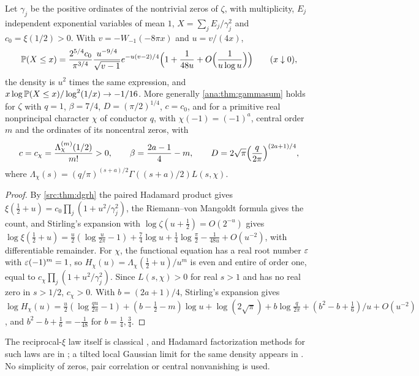 \begin{theorem}\label{ana:thm:smalldev}
Let $\gamma_j$ be the positive ordinates of the nontrivial zeros of $\zeta$, with multiplicity,
$E_j$ independent exponential variables of mean $1$, $X=\sum_jE_j/\gamma_j^2$ and
$c_0=\xi(1/2)>0$. With $v=-W_{-1}(-8\pi x)$ and $u=v/(4x)$,
\[
 \mathbb{P}(X\le x)=\frac{2^{5/4}c_0}{\pi^{3/4}}\frac{u^{-9/4}}{\sqrt{v-1}}e^{-u(v-2)/4}
 \Bigl(1+\frac1{48u}+O\Bigl(\frac1{u\log u}\Bigr)\Bigr)\qquad(x\downarrow0),
\]
the density is $u^2$ times the same expression, and
$x\log\mathbb{P}(X\le x)/\log^2(1/x)\to-1/16$. More generally \cref{ana:thm:gammasum} holds for
$\zeta$ with $q=1$, $\beta=7/4$, $D=(\pi/2)^{1/4}$, $c=c_0$, and for a primitive real
nonprincipal character $\chi$ of conductor $q$, with $\chi(-1)=(-1)^a$, central order $m$ and
the ordinates of its noncentral zeros, with
\[
 c=c_\chi=\frac{\Lambda_\chi^{(m)}(1/2)}{m!}>0,\qquad\beta=\frac{2a-1}4-m,\qquad
 D=2\sqrt\pi\Bigl(\frac q{2\pi}\Bigr)^{(2a+1)/4},
\]
where $\Lambda_\chi(s)=(q/\pi)^{(s+a)/2}\Gamma((s+a)/2)L(s,\chi)$.
\end{theorem}

\begin{proof}
By \cref{src:thm:dgrh} the paired Hadamard product gives
$\xi(\frac12+u)=c_0\prod_j(1+u^2/\gamma_j^2)$, the Riemann--von Mangoldt formula gives the
count, and Stirling's expansion with $\log\zeta(u+\frac12)=O(2^{-u})$ gives
$\log\xi(\frac12+u)=\frac u2(\log\frac u{2\pi}-1)+\frac74\log u+\frac14\log\frac\pi2-\frac1{48u}+O(u^{-2})$,
with differentiable remainder. For $\chi$, the functional equation has a real root number
$\varepsilon$ with $\varepsilon(-1)^m=1$, so $H_\chi(u)=\Lambda_\chi(\frac12+u)/u^m$ is even and entire of order
one, equal to $c_\chi\prod_j(1+u^2/\gamma_j^2)$. Since $L(s,\chi)>0$ for real $s>1$ and has no
real zero in $s>1/2$, $c_\chi>0$. With $b=(2a+1)/4$, Stirling's expansion gives
$\log H_\chi(u)=\frac u2(\log\frac{qu}{2\pi}-1)+(b-\frac12-m)\log u+\log(2\sqrt\pi)+b\log\frac q{2\pi}
+(b^2-b+\frac16)/u+O(u^{-2})$, and $b^2-b+\frac16=-\frac1{48}$ for $b=\frac14,\frac34$.
\end{proof}

The reciprocal-$\xi$ law itself is classical \cite{RoynetteYor2005Wald}, and Hadamard
factorization methods for such laws are in \cite{GaoHannigLeeTorcaso2003Laplace}; a tilted
local Gaussian limit for the same density appears in \cite{Sra2026Positivity}. No simplicity
of zeros, pair correlation or central nonvanishing is used.

